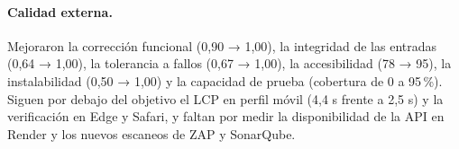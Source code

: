 \paragraph{Calidad externa.} Mejoraron la corrección funcional (0,90 → 1,00), la integridad de las entradas (0,64 → 1,00), la tolerancia a fallos (0,67 → 1,00), la accesibilidad (78 → 95), la instalabilidad (0,50 → 1,00) y la capacidad de prueba (cobertura de 0 a 95\,\%). Siguen por debajo del objetivo el LCP en perfil móvil (4,4 s frente a 2,5 s) y la verificación en Edge y Safari, y faltan por medir la disponibilidad de la API en Render y los nuevos escaneos de ZAP y SonarQube.
